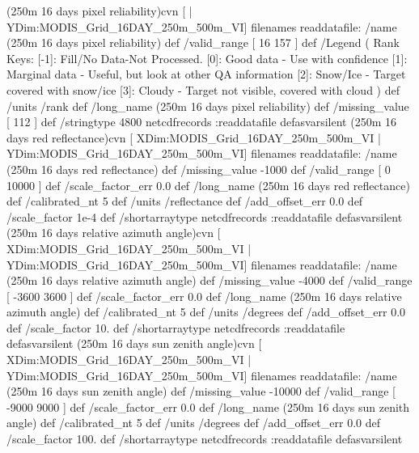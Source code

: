  (250m 16 days pixel reliability)cvn{
[ | YDim:MODIS_Grid_16DAY_250m_500m_VI] filenames readdatafile:
/name (250m 16 days pixel reliability) def
 /valid_range [ 16 157 ] def
 /Legend (
	 Rank Keys:
		[-1]:  Fill/No Data-Not Processed.
		 [0]:  Good data      - Use with confidence
		 [1]:  Marginal data  - Useful, but look at other QA information
		 [2]:  Snow/Ice       - Target covered with snow/ice
		 [3]:  Cloudy         - Target not visible, covered with cloud
) def
 /units /rank def
 /long_name (250m 16 days pixel reliability) def
 /missing_value [ 112 ] def
 /stringtype 4800 netcdfrecords :readdatafile
}defasvarsilent
 (250m 16 days red reflectance)cvn{
[ XDim:MODIS_Grid_16DAY_250m_500m_VI | YDim:MODIS_Grid_16DAY_250m_500m_VI] filenames readdatafile:
/name (250m 16 days red reflectance) def
 /missing_value -1000 def
 /valid_range [ 0 10000 ] def
 /scale_factor_err 0.0 def
 /long_name (250m 16 days red reflectance) def
 /calibrated_nt 5 def
 /units /reflectance def
 /add_offset_err 0.0 def
 /scale_factor 1e-4 def
 /shortarraytype netcdfrecords :readdatafile
}defasvarsilent
 (250m 16 days relative azimuth angle)cvn{
[ XDim:MODIS_Grid_16DAY_250m_500m_VI | YDim:MODIS_Grid_16DAY_250m_500m_VI] filenames readdatafile:
/name (250m 16 days relative azimuth angle) def
 /missing_value -4000 def
 /valid_range [ -3600 3600 ] def
 /scale_factor_err 0.0 def
 /long_name (250m 16 days relative azimuth angle) def
 /calibrated_nt 5 def
 /units /degrees def
 /add_offset_err 0.0 def
 /scale_factor 10. def
 /shortarraytype netcdfrecords :readdatafile
}defasvarsilent
 (250m 16 days sun zenith angle)cvn{
[ XDim:MODIS_Grid_16DAY_250m_500m_VI | YDim:MODIS_Grid_16DAY_250m_500m_VI] filenames readdatafile:
/name (250m 16 days sun zenith angle) def
 /missing_value -10000 def
 /valid_range [ -9000 9000 ] def
 /scale_factor_err 0.0 def
 /long_name (250m 16 days sun zenith angle) def
 /calibrated_nt 5 def
 /units /degrees def
 /add_offset_err 0.0 def
 /scale_factor 100. def
 /shortarraytype netcdfrecords :readdatafile
}defasvarsilent
